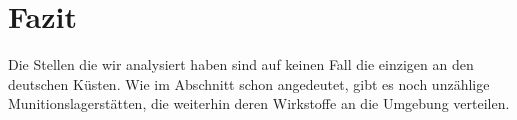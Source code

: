 
\chapter[Fazit]{Fazit}



Die Stellen die wir analysiert haben sind auf keinen Fall die einzigen 
an den deutschen Küsten. Wie im Abschnitt  schon 
angedeutet, gibt es noch unzählige Munitionslagerstätten, die weiterhin
deren Wirkstoffe an die Umgebung verteilen.
